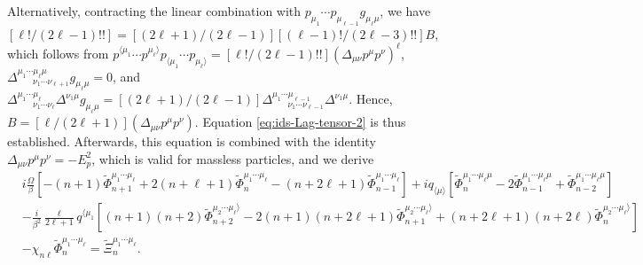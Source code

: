 \documentclass[aps,prd,preprint,nofootinbib,amsmath,amssymb,showpacs,longbibliography,singlecolumn,superscriptaddress,10pt]{revtex4-1}
\theoremstyle{plain}
\theoremstyle{definition}
\begin{document}
Alternatively, contracting the linear combination with $p_{\mu_{1}} \cdots p_{\mu_{\ell-1}} g_{\mu_{\ell} \mu}$, we have $[\ell!/(2\ell-1)!!] = [(2\ell + 1)/(2\ell - 1)][(\ell-1)!/(2\ell-3)!!] B$, which follows from $p^{\langle \mu_{1}} \cdots p^{\mu_{\ell} \rangle} p_{\langle \mu_{1}} \cdots p_{\mu_{\ell} \rangle}
=
[\ell!/(2 \ell - 1)!!] 
(\Delta_{\mu \nu} p^{\mu} p^{\nu})^{\ell}$, $\Delta^{\mu_{1} \cdots \mu_{\ell} \mu}_{ \ \ \ \ \ \ \ \ \nu_{1} \cdots \nu_{\ell + 1}} g_{\mu_{\ell} \mu} = 0$, and 
$\Delta^{\mu_{1} \cdots \mu_{\ell}}_{ \ \ \ \ \ \ \ \ \nu_{1} \cdots \nu_{\ell}} \Delta^{\nu_{1} \mu} g_{\mu_{\ell} \mu} = [(2\ell + 1)/(2\ell - 1)] \Delta^{\mu_{1} \cdots \mu_{\ell -1}}_{ \ \ \ \ \ \ \ \ \nu_{1} \cdots \nu_{\ell-1}} \Delta^{\nu_{1} \mu}$. Hence, $B = [\ell / (2\ell + 1)](\Delta_{\mu \nu} p^{\mu} p^{\nu})$. Equation \eqref{eq:ids-Lag-tensor-2} is thus established. Afterwards, this equation is combined with the identity $\Delta_{\mu \nu} p^{\mu} p^{\nu} = - E_p^{2}$, which is valid for massless particles, and we derive 
%
\begin{equation}
\label{eq:moments-lag}
\begin{aligned}
&
i \frac{\Omega}{\beta} \left[
-(n+1) \widetilde{\Phi}_{n+1}^{\mu_{1} \cdots \mu_{\ell}}
+
2(n+\ell+1)
\widetilde{\Phi}_{n}^{\mu_{1} \cdots \mu_{\ell}}
-
(n+2\ell+1)
\widetilde{\Phi}_{n-1}^{\mu_{1} \cdots \mu_{\ell}}
\right]
+ 
i q_{\langle \mu \rangle} \left[ \widetilde{\Phi}_{n}^{\mu_{1} \cdots \mu_{\ell} \mu}
-
2 \widetilde{\Phi}_{n-1}^{\mu_{1} \cdots \mu_{\ell} \mu}
+
\widetilde{\Phi}_{n-2}^{\mu_{1} \cdots \mu_{\ell} \mu}
\right]
\\
&
-
\frac{i}{\beta^{2}}  
 \frac{\ell}{2 \ell + 1}
q^{\langle \mu_{1}} 
\left[
(n+1)(n+2)
\widetilde{\Phi}_{n+2}^{\mu_{2} \cdots \mu_{\ell} \rangle}
-
2(n+1)(n+2\ell+1)
\widetilde{\Phi}_{n+1}^{\mu_{2} \cdots \mu_{\ell} \rangle}
+
(n+2\ell+1)(n+2\ell)
\widetilde{\Phi}_{n}^{\mu_{2} \cdots \mu_{\ell} \rangle}
\right]
\\
&
-
\chi_{n\ell}
\widetilde{\Phi}_{n}^{\mu_{1} \cdots \mu_{\ell}}
   = 
\widetilde{\Xi}_{n}^{\mu_{1} \cdots \mu_{\ell}}.
\end{aligned}
\end{equation}
%
\end{document}
